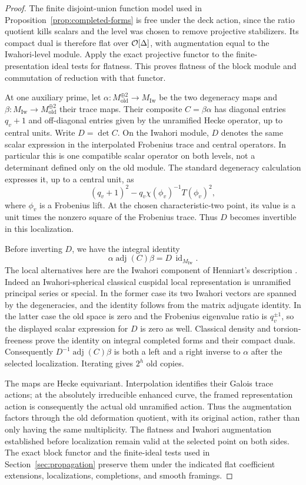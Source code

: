 \begin{proof}
The finite disjoint-union function model used in
Proposition~\ref{prop:completed-forms} is free under the
deck action, since the ratio quotient kills scalars
and the level was chosen to remove projective
stabilizers. Its compact dual is therefore flat over
\(\mathcal O[\Delta]\), with augmentation equal to the
Iwahori-level module. Apply the exact projective
functor to the finite-presentation ideal tests for
flatness. This proves flatness of the block module
and commutation of reduction with that functor.

At one auxiliary prime, let
\(\alpha:M_{\mathrm{old}}^{\oplus2}\to M_{\mathrm{Iw}}\)
be the two degeneracy maps and
\(\beta:M_{\mathrm{Iw}}\to M_{\mathrm{old}}^{\oplus2}\)
their trace maps. Their composite \(C=\beta\alpha\)
has diagonal entries \(q_v+1\) and off-diagonal entries
given by the unramified Hecke operator, up to central
units. Write \(D=\det C\). On the Iwahori module,
\(D\) denotes the same scalar expression in the
interpolated Frobenius trace and central operators.
In particular this is one compatible scalar operator
on both levels, not a determinant defined only on
the old module. The standard degeneracy calculation
expresses it, up to a central unit, as
\[
 (q_v+1)^2-q_v\chi(\phi_v)^{-1}T(\phi_v)^2,
\]
where \(\phi_v\) is a Frobenius lift. At the chosen
characteristic-two point, its value is a unit times
the nonzero square of the Frobenius trace. Thus
\(D\) becomes invertible in this localization.

Before inverting \(D\), we have the integral identity
\[
 \alpha\operatorname{adj}(C)\beta
       =D\,\operatorname{id}_{M_{\mathrm{Iw}}}.
\]
The local alternatives here are the Iwahori component of Henniart's
description \cite[Appendix~A, Sections~A.1.3 and~A.2.3]{BreuilMezard2002}.
Indeed an Iwahori-spherical classical cuspidal local
representation is unramified principal series or
special. In the former case its two Iwahori vectors
are spanned by the degeneracies, and the identity
follows from the matrix adjugate identity. In the
latter case the old space is zero and the Frobenius
eigenvalue ratio is \(q_v^{\pm1}\), so the displayed
scalar expression for \(D\) is zero as well.
Classical density and torsion-freeness prove the
identity on integral completed forms and their
compact duals. Consequently
\(D^{-1}\operatorname{adj}(C)\beta\) is both a
left and a right inverse to \(\alpha\) after the
selected localization. Iterating gives \(2^h\) old
copies.

The maps are Hecke equivariant. Interpolation
identifies their Galois trace actions; at the
absolutely irreducible enhanced curve, the framed
representation action is consequently the actual
old unramified action. Thus the augmentation
factors through the old deformation quotient,
with its original action, rather than only having
the same multiplicity. The flatness and Iwahori
augmentation established before localization
remain valid at the selected point on both sides.
The exact block functor and the finite-ideal tests
used in Section~\ref{sec:propagation} preserve them
under the indicated flat coefficient extensions,
localizations, completions, and smooth framings.


\end{proof}
